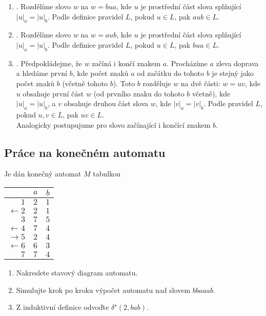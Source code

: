 \begin{enumerate}[label={}]
    \item {}. Rozdělíme slovo $w$ na $w = bua$, kde $u$ je prostřední část slova splňující
    $|u|_a = |u|_b$. Podle definice pravidel $L$, pokud $u \in L$, pak $aub \in L$.
    \item {}. Rozdělíme slovo $w$ na $w = aub$, kde $u$ je prostřední část slova splňující
    $|u|_a = |u|_b$. Podle definice pravidel $L$, pokud $u \in L$, pak $bua \in L$.
    \item {}. Předpokládejme, že $w$ začíná i končí znakem $a$. Procházíme $a$ zleva
    doprava a hledáme první $b$, kde počet znaků $a$ od začátku do tohoto $b$ je stejný jako počet znaků $b$ (včetně
    tohoto $b$). Toto $b$ rozděluje $w$ na dvě části: $w = uv$, kde $u$ obsahuje první část $w$ (od prvního znaku do
    tohoto $b$ včetně), kde $|u|_a = |u|_b$, a $v$ obsahuje druhou část slova $w$, kde $|v|_a = |v|_b$. Podle pravidel
    $L$, pokud $u, v \in L$, pak $uv \in L$. \\
    Analogicky postupujume pro slovo začínající i končící znakem $b$.
\end{enumerate}

\subsection{Práce na konečném automatu}
Je dán konečný automat $M$ tabulkou

\begin{multicols}{2}

\begin{tabular}{|r|c|c|}
    \hline
    & $a$ & $b$\\
    \hline
    \hline
    $1$            & $2$   & $1$\\
    $\leftarrow 2$ & $2$   & $1$\\
    $3$            & $7$   & $5$\\
    $\leftarrow 4$ & $7$   & $4$\\
    $\rightarrow 5$& $2$   & $4$\\
    $\leftarrow 6$ & $6$   & $3$\\
    $ 7$           & $7$   & $4$\\
    \hline
\end{tabular}

\columnbreak

\begin{enumerate}[noitemsep]
    \item Nakreslete stavový diagram automatu.
    \item Simulujte krok po kroku výpočet automatu nad slovem $bbaaab$.
    \item Z induktivní definice odvoďte $\delta^\star(2, bab)$.
\end{enumerate}

\end{multicols}

